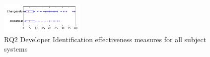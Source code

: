 
\begin{figure}[t]
\centering
\includegraphics[width=0.36\textwidth]{figures/dit/rq2_tiny}
\caption{RQ2 Developer Identification effectiveness measures for all subject systems}
\label{fig:dit:rq2:tiny}
\end{figure}
